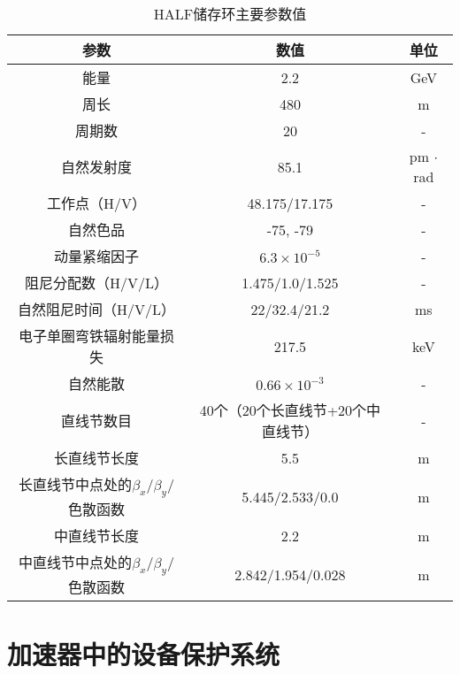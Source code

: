 \begin{table}[!htb]
	\centering\small
	\caption{HALF储存环主要参数值}
	\label{table:4.1}
	  \begin{tabular}{ccc}
		  \toprule
		  参数        & 数值 & 单位\\
		  \midrule
		  能量  &  2.2  & GeV \\
		  周长  & 480  &  m \\
		  周期数  & 20 & - \\
		  自然发射度  & 85.1  &  pm $\cdot$ rad \\
		  工作点（H/V）  & 48.175/17.175  & - \\
		  自然色品  & -75, -79  &  - \\
		  动量紧缩因子   & $6.3\times 10^{-5}$  &  - \\
		  阻尼分配数（H/V/L）  &  1.475/1.0/1.525  & -  \\
		  自然阻尼时间（H/V/L）  & 22/32.4/21.2  & ms \\
		  电子单圈弯铁辐射能量损失 & 217.5  &  keV \\
		  自然能散  & $0.66\times 10^{-3}$   & - \\
		  直线节数目  & 40个（20个长直线节+20个中直线节）& - \\
		  长直线节长度  & 5.5& m \\
		  长直线节中点处的$\beta_{x}$/$\beta_{y}$/色散函数 & 5.445/2.533/0.0 & m \\
		  中直线节长度  & 2.2 & m \\
		  中直线节中点处的$\beta_{x}$/$\beta_{y}$/色散函数  & 2.842/1.954/0.028 & m \\
		  \bottomrule
	  \end{tabular}
\end{table}

\section{加速器中的设备保护系统}

